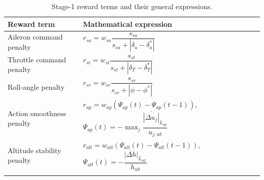 \documentclass[pdflatex,sn-mathphys-num]{sn-jnl}%
\theoremstyle{thmstyleone}%
\theoremstyle{thmstyletwo}%
\theoremstyle{thmstylethree}%
\begin{document}
\begin{table}[h]
\caption{Stage-1 reward terms and their general expressions.}\label{tab:reward_stage1}%
\begin{tabular*}{\textwidth}{@{\extracolsep\fill}p{}p{}}
\toprule
Reward term & Mathematical expression \\
\midrule
Aileron command penalty
& $r_{sa}=w_{sa}\dfrac{s_{sa}}{s_{sa}+|\delta_a-\delta_a^{\ast}|}$ \\[6pt]

Throttle command penalty
& $r_{st}=w_{st}\dfrac{s_{st}}{s_{st}+|\delta_T-\delta_T^{\ast}|}$ \\[6pt]

Roll-angle penalty
& $r_{sr}=w_{sr}\dfrac{s_{sr}}{s_{sr}+|\phi-\phi^{\ast}|}$ \\[6pt]

Action smoothness penalty
& $r_{ap}=w_{ap}\left(\Psi_{ap}(t)-\Psi_{ap}(t-1)\right)$, 
  $\Psi_{ap}(t)=-\max_j\dfrac{\overline{|\Delta u_j|}_{L_{ap}}}{u_{j,ub}}$ \\[6pt]

Altitude stability penalty
& $r_{alt}=w_{alt}\left(\Psi_{alt}(t)-\Psi_{alt}(t-1)\right)$,
  $\Psi_{alt}(t)=-\dfrac{\overline{|\Delta h|}_{L_{alt}}}{h_{ub}}$ \\
\botrule
\end{tabular*}
\end{table}
\end{document}
